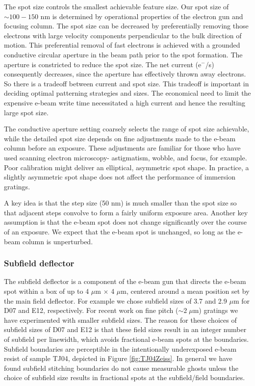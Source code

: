 \documentclass[]{spie}  %
\begin{document}
The spot size controls the smallest achievable feature size.  Our spot size of $\sim 100 - 150$ nm is determined by operational properties of the electron gun and focusing column.  The spot size can be decreased by preferentially removing those electrons with large velocity components perpendicular to the bulk direction of motion.  This preferential removal of fast electrons is achieved with a grounded conductive circular aperture in the beam path prior to the spot formation.  The aperture is constricted to reduce the spot size.  The net current (e$^-$/s) consequently decreases, since the aperture has effectively thrown away electrons.  So there is a tradeoff between current and spot size.  This tradeoff is important in deciding optimal patterning strategies and sizes.  The economical need to limit the expensive e-beam write time necessitated a high current and hence the resulting large spot size.

The conductive aperture setting coarsely selects the range of spot size achievable, while the detailed spot size depends on fine adjustments made to the e-beam column before an exposure.  These adjustments are familiar for those who have used scanning electron microscopy- astigmatism, wobble, and focus, for example.  Poor calibration might deliver an elliptical, asymmetric spot shape.  In practice, a slightly asymmetric spot shape does not affect the performance of immersion gratings.

A key idea is that the step size (50 nm) is much smaller than the spot size so that adjacent steps convolve to form a fairly uniform exposure area.  Another key assumption is that the e-beam spot does not change significantly over the course of an exposure.  We expect that the e-beam spot is unchanged, so long as the e-beam column is unperturbed.

\subsubsection{Subfield deflector}
The subfield deflector is a component of the e-beam gun that directs the e-beam spot within a box of up to 4 $\mu$m $\times$ 4 $\mu$m, centered around a mean position set by the main field deflector.  For example we chose subfield sizes of 3.7 and 2.9 $\mu$m for D07 and E12, respectively.  For recent work on fine pitch ($\sim2\; \mu$m) gratings we have experimented with smaller subfield sizes.  The reason for these choices of subfield sizes of D07 and E12 is that these field sizes result in an integer number of subfield per linewidth, which avoids fractional e-beam spots at the boundaries.  Subfield boundaries are perceptible in the intentionally underexposed e-beam resist of sample TJ04, depicted in Figure \ref{fig:TJ04Zeiss}.  In general we have found subfield stitching boundaries do not cause measurable ghosts unless the choice of subfield size results in fractional spots at the subfield/field boundaries.  
\end{document}
